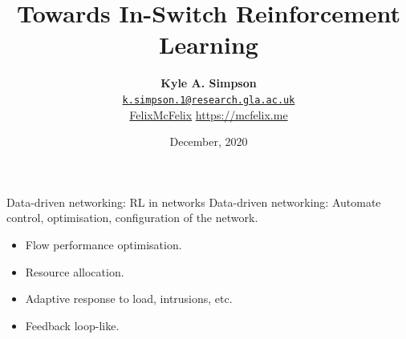 \documentclass[aspectratio=169,xcolor={dvipsnames}
,handout
]{beamer}
\title{Towards In-Switch Reinforcement Learning}
\author{\vspace{-1em}\textbf{Kyle A. Simpson}\\
	\faEnvelopeO{} \href{mailto:k.simpson.1@research.gla.ac.uk}{\nolinkurl{k.simpson.1@research.gla.ac.uk}}\\
	\vspace{1em}\small{\faGithub{} \href{https://github.com/felixmcfelix}{FelixMcFelix} \hspace{0.5em} \faGlobe{} \url{https://mcfelix.me}}}
\institute{University of Glasgow}
\date{\nth{2} December, 2020}
\begin{document}
\begin{frame}
\maketitle
\end{frame}

\begin{frame}{Data-driven networking: RL in networks}
	\alert{Data-driven networking}: Automate control, optimisation, configuration of the network.
	\begin{itemize}
		\item Flow performance optimisation.
		\item Resource allocation.
		\item Adaptive response to load, intrusions, etc.
		\item Feedback loop-like.
	\end{itemize}
\end{frame}
\end{document}
